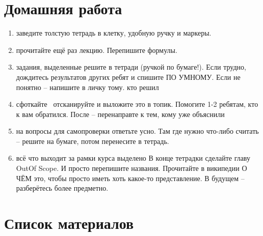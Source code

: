 \section{Домашняя работа}
\begin{frame}

\small
\begin{enumerate}
 \item заведите толстую тетрадь в клетку, удобную ручку и маркеры.
 \item прочитайте ещё раз лекцию. Перепишите формулы.
 \item задания, выделенные  решите в тетради (ручкой по бумаге!). Если трудно, дождитесь результатов других ребят и спишите ПО УМНОМУ. Если не понятно -- напишите в личку тому. кто решил
 \item сфоткайте \ отсканируйте и выложите это в топик. Помогите 1-2 ребятам, кто к вам обратился. После -- перенаправте к тем, кому уже объяснили
 \item на вопросы для самопроверки ответьте усно. Там где нужно что-либо считать -- решите на бумаге, потом перенесите в тетрадь.
 \item всё что выходит за рамки курса выделено  В конце тетрадки сделайте главу OutOf Scope. И просто перепишите названия. Прочитайте в википедии О ЧЁМ это, чтобы просто иметь хоть какое-то представление. В будущем -- разберётесь более предметно.
\end{enumerate}


\end{frame}

\section{Список материалов}


  
